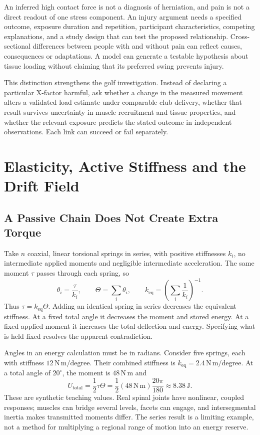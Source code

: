 An inferred high contact force is not a diagnosis of herniation, and pain is not a direct readout of one stress component. An injury argument needs a specified outcome, exposure duration and repetition, participant characteristics, competing explanations, and a study design that can test the proposed relationship. Cross-sectional differences between people with and without pain can reflect causes, consequences or adaptations. A model can generate a testable hypothesis about tissue loading without claiming that its preferred swing prevents injury.

This distinction strengthens the golf investigation. Instead of declaring a particular X-factor harmful, ask whether a change in the measured movement alters a validated load estimate under comparable club delivery, whether that result survives uncertainty in muscle recruitment and tissue properties, and whether the relevant exposure predicts the stated outcome in independent observations. Each link can succeed or fail separately.

\section{Elasticity, Active Stiffness and the Drift Field}
\label{sec:spine_drift}

\subsection{A Passive Chain Does Not Create Extra Torque}
Take $n$ coaxial, linear torsional springs in series, with positive stiffnesses $k_i$, no intermediate applied moments and negligible intermediate acceleration. The same moment $\tau$ passes through each spring, so
\begin{equation}
\theta_i=\frac{\tau}{k_i},\qquad
\Theta=\sum_i\theta_i,\qquad
k_{\mathrm{eq}}=\left(\sum_i\frac{1}{k_i}\right)^{-1}.
\end{equation}
Thus $\tau=k_{\mathrm{eq}}\Theta$. Adding an identical spring in series decreases the equivalent stiffness. At a fixed total angle it decreases the moment and stored energy. At a fixed applied moment it increases the total deflection and energy. Specifying what is held fixed resolves the apparent contradiction.

Angles in an energy calculation must be in radians. Consider five springs, each with stiffness $12\,\mathrm{N\,m/degree}$. Their combined stiffness is $k_{\mathrm{eq}}=2.4\,\mathrm{N\,m/degree}$. At a total angle of $20^\circ$, the moment is $48\,\mathrm{N\,m}$ and
\begin{equation}
U_{\mathrm{total}}=\frac12\tau\Theta
=\frac12(48\,\mathrm{N\,m})\frac{20\pi}{180}
\approx8.38\,\mathrm{J}.
\end{equation}
These are synthetic teaching values. Real spinal joints have nonlinear, coupled responses; muscles can bridge several levels, facets can engage, and intersegmental inertia makes transmitted moments differ. The series result is a limiting example, not a method for multiplying a regional range of motion into an energy reserve.

